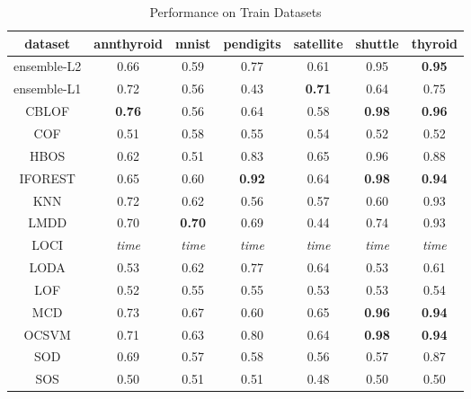 \begin{table*}[!t]
\renewcommand{\arraystretch}{1.25}
\caption{Performance on Train Datasets}
\label{table:results:train-performance}
\centering
\begin{tabular}{|c|c|c|c|c|c|c|}
\toprule
\textbf{dataset} & \textbf{annthyroid} & \textbf{mnist} & \textbf{pendigits} & \textbf{satellite} & \textbf{shuttle} & \textbf{thyroid} \\
\midrule
ensemble-L2 & 0.66 & 0.59 & 0.77 & 0.61 & 0.95 & \bfseries 0.95 \\
\hline
ensemble-L1 & 0.72 & 0.56 & 0.43 & \bfseries 0.71 & 0.64 & 0.75 \\
\hline
CBLOF & \bfseries 0.76 & 0.56 & 0.64 & 0.58 & \bfseries 0.98 & \bfseries 0.96 \\
\hline
COF & 0.51 & 0.58 & 0.55 & 0.54 & 0.52 & 0.52 \\
\hline
HBOS & 0.62 & 0.51 & 0.83 & 0.65 & 0.96 & 0.88 \\
\hline
IFOREST & 0.65 & 0.60 & \bfseries 0.92 & 0.64 & \bfseries 0.98 & \bfseries 0.94 \\
\hline
KNN & 0.72 & 0.62 & 0.56 & 0.57 & 0.60 & 0.93 \\
\hline
LMDD & 0.70 & \bfseries 0.70 & 0.69 & 0.44 & 0.74 & 0.93 \\
\hline
LOCI & \textit{time} & \textit{time} & \textit{time} & \textit{time} & \textit{time} & \textit{time} \\
\hline
LODA & 0.53 & 0.62 & 0.77 & 0.64 & 0.53 & 0.61 \\
\hline
LOF & 0.52 & 0.55 & 0.55 & 0.53 & 0.53 & 0.54 \\
\hline
MCD & 0.73 & 0.67 & 0.60 & 0.65 & \bfseries 0.96 & \bfseries 0.94 \\
\hline
OCSVM & 0.71 & 0.63 & 0.80 & 0.64 & \bfseries 0.98 & \bfseries 0.94 \\
\hline
SOD & 0.69 & 0.57 & 0.58 & 0.56 & 0.57 & 0.87 \\
\hline
SOS & 0.50 & 0.51 & 0.51 & 0.48 & 0.50 & 0.50 \\
\bottomrule
\end{tabular}
\end{table*}

